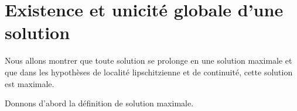 \documentclass[a4paper, 11pt]{report}
\begin{document}
\section{Existence et unicité globale d'une solution}

Nous allons montrer que toute solution se prolonge en une solution maximale et
que dans les hypothèses de localité lipschitzienne et de continuité, cette
solution est maximale.

Donnons d'abord la définition de solution maximale.
\end{document}
